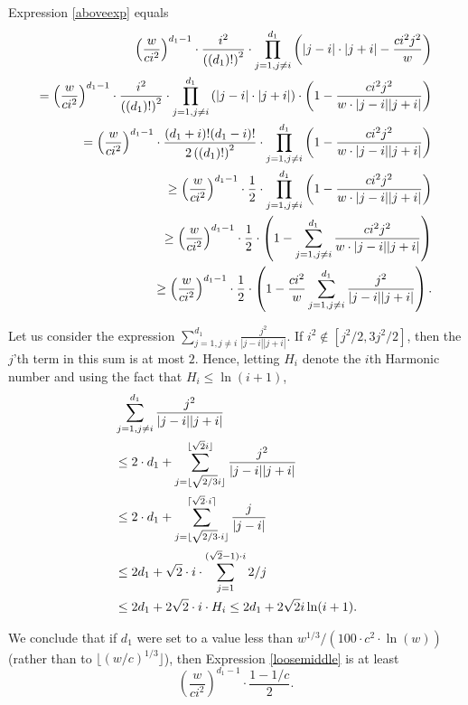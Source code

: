 \documentclass[10pt,a4paper]{article}
\newcommand{\<}{\langle}
\renewcommand{\>}{\rangle}
\begin{document}
Expression \eqref{aboveexp} equals
\begin{align}
\left(\frac{w}{ci^2}\right)^{d_1-1} \cdot \frac{i^2}{\left((d_1)!\right)^2}
\cdot \prod_{j=1, j \neq i}^{d_1}\left( \left|j-i| \cdot |j+i\right| - \frac{
c i^2 j^2}{w}\right)  \notag \\
= \left(\frac{w}{ci^2}\right)^{d_1-1} \cdot \frac{i^2}{\left((d_1)!\right)^2}
\cdot \prod_{j=1, j \neq i}^{d_1}\left( \left|j-i| \cdot |j+i\right| \right)
\cdot \left(1-\frac{c i^2 j^2}{w \cdot |j-i| |j+i|}\right)  \notag \\
= \left(\frac{w}{ci^2}\right)^{d_1-1} \cdot \frac{(d_1+i)! (d_1-i)!}{
2\left((d_1)!\right)^2} \cdot \prod_{j=1, j \neq i}^{d_1} \left(1-\frac{c
i^2 j^2}{w \cdot |j-i| |j+i|}\right)  \label{looseversion} \\
\geq \left(\frac{w}{ci^2}\right)^{d_1-1} \cdot \frac{1}{2} \cdot \prod_{j=1,
j \neq i}^{d_1} \left(1-\frac{c i^2 j^2}{w \cdot |j-i| |j+i|}\right)  \notag
\\
\geq \left(\frac{w}{ci^2}\right)^{d_1-1} \cdot \frac{1}{2} \cdot
\left(1-\sum_{j=1, j \neq i }^{d_1}\frac{c i^2 j^2}{w \cdot |j-i| |j+i|}
\right)  \notag \\
\geq \left(\frac{w}{ci^2}\right)^{d_1-1} \cdot \frac{1}{2} \cdot \left(1-
\frac{c i^2}{w}\sum_{j=1, j \neq i }^{d_1}\frac{j^2}{ |j-i| |j+i|}\right).
\label{loosemiddle}
\end{align}

Let us consider the expression $\sum_{j=1, j \neq i }^{d_1}\frac{j^2}{ |j-i|
|j+i|}$. If $i^2 \not \in [j^2/2, 3j^2/2]$, then the $j$'th term in this sum
is at most $2$. Hence, letting $H_i$ denote the $i$th Harmonic number and
using the fact that $H_i \leq \ln(i+1)$,
\begin{align}
& \sum_{j=1, j \neq i }^{d_1}\frac{j^2}{ |j-i| |j+i|}  \notag \\
& \leq 2 \cdot d_1 + \sum_{j = \lfloor \sqrt{2/3} i \rfloor}^{\lfloor \sqrt{2
} i \rfloor} \frac{j^2}{|j-i| |j+i|}  \notag \\
& \leq 2 \cdot d_1 + \sum_{j = \lfloor \sqrt{2/3} \cdot i \rfloor}^{\lceil
\sqrt{2} \cdot i \rceil} \frac{j}{|j-i|}  \notag \\
& \leq 2 d_1 + \sqrt{2} \cdot i \cdot \sum_{j=1}^{(\sqrt{2}-1) \cdot i} 2/j
\notag \\
& \leq 2 d_1 + 2 \sqrt{2} \cdot i \cdot H_{i} \leq 2d_1 + 2 \sqrt{2} i
\ln(i+1).  \label{eq:ieq}
\end{align}

We conclude that if $d_1$ were set to a value less than $w^{1/3}/(100 \cdot
c^2 \cdot \ln(w))$ (rather than to $\lfloor \left(w/c\right)^{1/3}\rfloor$),
then Expression \eqref{loosemiddle} is at least
\begin{equation}
\left(\frac{w}{ci^2}\right)^{d_1-1} \cdot \frac{1-1/c}{2}.
\end{equation}
\end{document}
